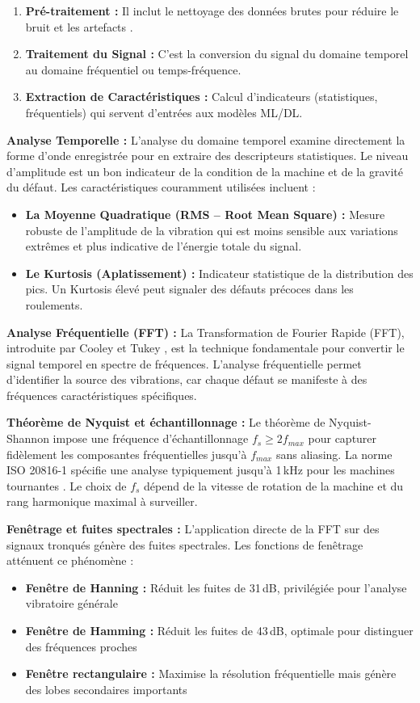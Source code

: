 \begin{enumerate}
\item \textbf{Pré-traitement :} Il inclut le nettoyage des données brutes pour réduire le bruit et les artefacts \cite{bagri2024}.
\item \textbf{Traitement du Signal :} C'est la conversion du signal du domaine temporel au domaine fréquentiel ou temps-fréquence.
\item \textbf{Extraction de Caractéristiques :} Calcul d'indicateurs (statistiques, fréquentiels) qui servent d'entrées aux modèles ML/DL.
\end{enumerate}

\textbf{Analyse Temporelle :} L'analyse du domaine temporel examine directement la forme d'onde enregistrée pour en extraire des descripteurs statistiques. Le niveau d'amplitude est un bon indicateur de la condition de la machine et de la gravité du défaut. Les caractéristiques couramment utilisées incluent :
\begin{itemize}
\item \textbf{La Moyenne Quadratique (RMS -- Root Mean Square) :} Mesure robuste de l'amplitude de la vibration qui est moins sensible aux variations extrêmes et plus indicative de l'énergie totale du signal.
\item \textbf{Le Kurtosis (Aplatissement) :} Indicateur statistique de la distribution des pics. Un Kurtosis élevé peut signaler des défauts précoces dans les roulements.
\end{itemize}

\textbf{Analyse Fréquentielle (FFT) :} La Transformation de Fourier Rapide (FFT), introduite par Cooley et Tukey \cite{cooley1965}, est la technique fondamentale pour convertir le signal temporel en spectre de fréquences. L'analyse fréquentielle permet d'identifier la source des vibrations, car chaque défaut se manifeste à des fréquences caractéristiques spécifiques.

\textbf{Théorème de Nyquist et échantillonnage :} Le théorème de Nyquist-Shannon impose une fréquence d'échantillonnage $f_s \geq 2f_{max}$ pour capturer fidèlement les composantes fréquentielles jusqu'à $f_{max}$ sans aliasing. La norme ISO 20816-1 spécifie une analyse typiquement jusqu'à 1\,kHz pour les machines tournantes \cite{iso20816-1}. Le choix de $f_s$ dépend de la vitesse de rotation de la machine et du rang harmonique maximal à surveiller.

\textbf{Fenêtrage et fuites spectrales :} L'application directe de la FFT sur des signaux tronqués génère des fuites spectrales. Les fonctions de fenêtrage atténuent ce phénomène :
\begin{itemize}
\item \textbf{Fenêtre de Hanning :} Réduit les fuites de 31\,dB, privilégiée pour l'analyse vibratoire générale
\item \textbf{Fenêtre de Hamming :} Réduit les fuites de 43\,dB, optimale pour distinguer des fréquences proches
\item \textbf{Fenêtre rectangulaire :} Maximise la résolution fréquentielle mais génère des lobes secondaires importants
\end{itemize}

